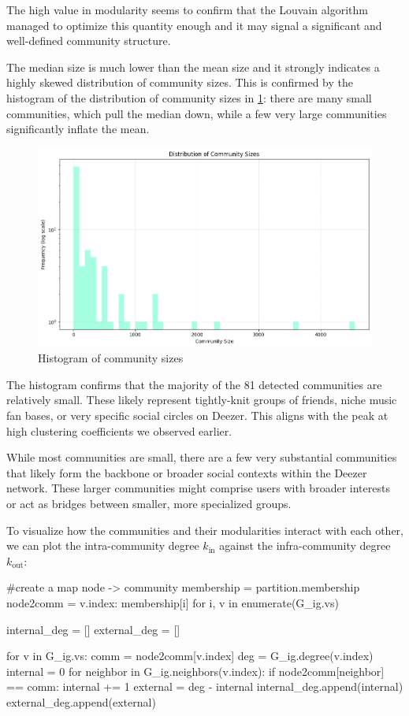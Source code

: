 \documentclass[12pt]{article}
\begin{document}
The high value in modularity seems to confirm that the Louvain algorithm managed to optimize this quantity enough and it may signal a significant and well-defined community structure.\par
The median size is much lower than the mean size and it strongly indicates a highly skewed distribution of community sizes. This is confirmed by the histogram of the distribution of community sizes in \ref{fig:screenshot009}: there are many small communities, which pull the median down, while a few very large communities significantly inflate the mean.
\begin{figure}[h]
	\centering
	\includegraphics[width=0.6\linewidth]{screenshot009}
	\caption{Histogram of community sizes}
	\label{fig:screenshot009}
\end{figure}
The histogram confirms that the majority of the 81 detected communities are relatively small. These likely represent tightly-knit groups of friends, niche music fan bases, or very specific social circles on Deezer. This aligns with the peak at high clustering coefficients we observed earlier.\par
While most communities are small, there are a few very substantial communities that likely form the backbone or broader social contexts within the Deezer network. These larger communities might comprise users with broader interests or act as bridges between smaller, more specialized groups.\par
To visualize how the communities and their modularities interact with each other, we can plot the intra-community degree $k_{\mathrm{in}}$ against the infra-community degree $k_{\mathrm{out}}$: 
\begin{py}
	#create a map node -> community
	membership = partition.membership
	node2comm = {v.index: membership[i] for i, v in enumerate(G_ig.vs)}
	
	internal_deg = []
	external_deg = []
	
	for v in G_ig.vs:
		comm = node2comm[v.index]
		deg = G_ig.degree(v.index)
		internal = 0
		for neighbor in G_ig.neighbors(v.index):
			if node2comm[neighbor] == comm:
				internal += 1
		external = deg - internal
		internal_deg.append(internal)
		external_deg.append(external)
\end{py}
\end{document}
